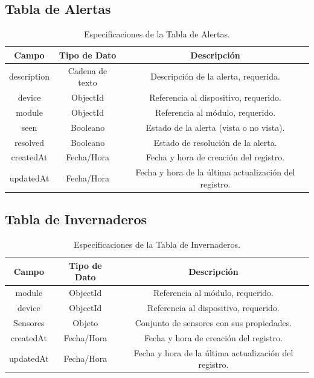 \subsection{Tabla de Alertas}
\begin{table}[h!]
    \centering
    \begin{tabular}{|c|c|c|}
    \hline
    \rowcolor[HTML]{FCE8B2} 
    \textbf{Campo} & \textbf{Tipo de Dato} & \textbf{Descripción} \\ \hline
    description & Cadena de texto & Descripción de la alerta, requerida. \\ \hline
    device & ObjectId & Referencia al dispositivo, requerido. \\ \hline
    module & ObjectId & Referencia al módulo, requerido. \\ \hline
    seen & Booleano & Estado de la alerta (vista o no vista). \\ \hline
    resolved & Booleano & Estado de resolución de la alerta. \\ \hline
    createdAt & Fecha/Hora & Fecha y hora de creación del registro. \\ \hline
    updatedAt & Fecha/Hora & Fecha y hora de la última actualización del registro. \\ \hline
    \end{tabular}
    \caption{Especificaciones de la Tabla de Alertas.}
\end{table}

\subsection{Tabla de Invernaderos}
\begin{table}[h!]
    \centering
    \begin{tabular}{|c|c|c|}
    \hline
    \rowcolor[HTML]{FCE8B2} 
    \textbf{Campo} & \textbf{Tipo de Dato} & \textbf{Descripción} \\ \hline
    module & ObjectId & Referencia al módulo, requerido. \\ \hline
    device & ObjectId & Referencia al dispositivo, requerido. \\ \hline
    Sensores & Objeto & Conjunto de sensores con sus propiedades. \\ \hline
    createdAt & Fecha/Hora & Fecha y hora de creación del registro. \\ \hline
    updatedAt & Fecha/Hora & Fecha y hora de la última actualización del registro. \\ \hline
    \end{tabular}
    \caption{Especificaciones de la Tabla de Invernaderos.}
\end{table}